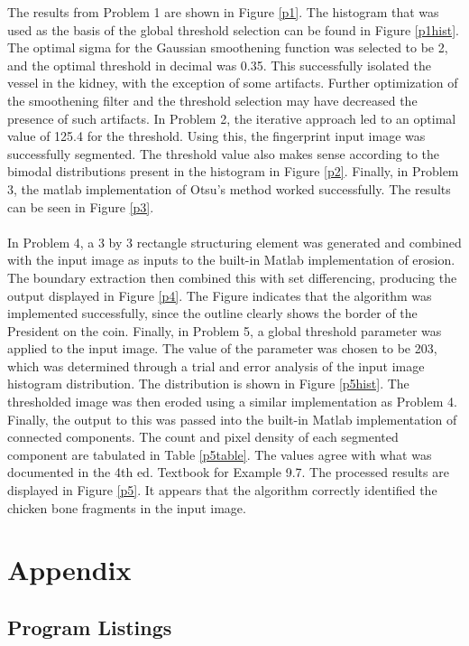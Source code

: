 \documentclass[./rarnold_project_89.tex]{subfiles}
\begin{document}
\noindent The results from Problem 1 are shown in Figure \ref{p1}.  The histogram that was used as the basis of the global threshold selection can be found in Figure \ref{p1hist}. The optimal sigma for the Gaussian smoothening function was selected to be 2, and the optimal threshold in decimal was 0.35.
This successfully isolated the vessel in the kidney, with the exception of some artifacts. Further optimization of the smoothening filter and the threshold selection may
have decreased the presence of such artifacts.  In Problem 2, the iterative approach led to an optimal value of 125.4 for the threshold.  Using this, 
the fingerprint input image was successfully segmented.  The threshold value also makes sense according to the bimodal distributions present in the histogram in 
Figure \ref{p2}.  Finally, in Problem 3, the matlab implementation of Otsu's method worked successfully.  The results can be seen in Figure \ref{p3}.
\\ \\
\noindent In Problem 4, a 3 by 3 rectangle structuring element was generated and combined with the input image as inputs to the 
built-in Matlab implementation of erosion.  The boundary extraction then combined this with set differencing, producing the output displayed in Figure \ref{p4}.
The Figure indicates that the algorithm was implemented successfully, since the outline clearly shows the border of the President on the coin.
Finally, in Problem 5, a global threshold parameter was applied to the input image.  The value of the parameter was chosen to be 203, 
which was determined through a trial and error analysis of the input image histogram distribution.  The distribution is shown in Figure \ref{p5hist}.  The thresholded image was then eroded using 
a similar implementation as Problem 4.  Finally, the output to this was passed into the built-in Matlab implementation of connected components.
The count and pixel density of each segmented component are tabulated in Table \ref{p5table}.  The values agree with what was documented in the 4th ed. Textbook for Example 9.7.
The processed results are displayed in Figure \ref{p5}.  It appears that the algorithm correctly identified the chicken bone fragments in the input image.
\clearpage

\section*{Appendix}
\subsection*{Program Listings}
\end{document}
